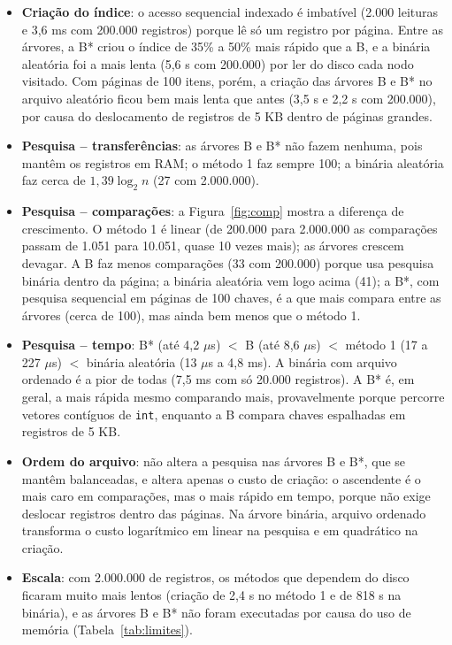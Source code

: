\documentclass{article}
\begin{document}
\begin{itemize}
    \item \textbf{Criação do índice}: o acesso sequencial indexado é imbatível (2.000 leituras e 3,6 ms com 200.000 registros) porque lê só um registro por página. Entre as árvores, a B* criou o índice de 35\% a 50\% mais rápido que a B, e a binária aleatória foi a mais lenta (5,6 s com 200.000) por ler do disco cada nodo visitado. Com páginas de 100 itens, porém, a criação das árvores B e B* no arquivo aleatório ficou bem mais lenta que antes (3,5 s e 2,2 s com 200.000), por causa do deslocamento de registros de 5 KB dentro de páginas grandes.
    \item \textbf{Pesquisa -- transferências}: as árvores B e B* não fazem nenhuma, pois mantêm os registros em RAM; o método 1 faz sempre 100; a binária aleatória faz cerca de $1{,}39 \log_2 n$ (27 com 2.000.000).
    \item \textbf{Pesquisa -- comparações}: a Figura~\ref{fig:comp} mostra a diferença de crescimento. O método 1 é linear (de 200.000 para 2.000.000 as comparações passam de 1.051 para 10.051, quase 10 vezes mais); as árvores crescem devagar. A B faz menos comparações (33 com 200.000) porque usa pesquisa binária dentro da página; a binária aleatória vem logo acima (41); a B*, com pesquisa sequencial em páginas de 100 chaves, é a que mais compara entre as árvores (cerca de 100), mas ainda bem menos que o método 1.
    \item \textbf{Pesquisa -- tempo}: B* (até 4,2 $\mu$s) $<$ B (até 8,6 $\mu$s) $<$ método 1 (17 a 227 $\mu$s) $<$ binária aleatória (13 $\mu$s a 4,8 ms). A binária com arquivo ordenado é a pior de todas (7,5 ms com só 20.000 registros). A B* é, em geral, a mais rápida mesmo comparando mais, provavelmente porque percorre vetores contíguos de \texttt{int}, enquanto a B compara chaves espalhadas em registros de 5 KB.
    \item \textbf{Ordem do arquivo}: não altera a pesquisa nas árvores B e B*, que se mantêm balanceadas, e altera apenas o custo de criação: o ascendente é o mais caro em comparações, mas o mais rápido em tempo, porque não exige deslocar registros dentro das páginas. Na árvore binária, arquivo ordenado transforma o custo logarítmico em linear na pesquisa e em quadrático na criação.
    \item \textbf{Escala}: com 2.000.000 de registros, os métodos que dependem do disco ficaram muito mais lentos (criação de 2,4 s no método 1 e de 818 s na binária), e as árvores B e B* não foram executadas por causa do uso de memória (Tabela~\ref{tab:limites}).
\end{itemize}
\end{document}
